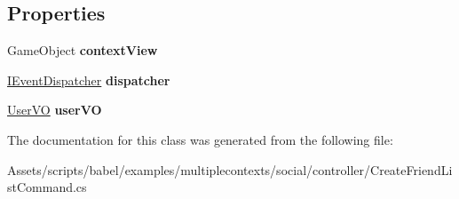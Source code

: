 \subsection*{Properties}
\begin{DoxyCompactItemize}
\item 
\hypertarget{classbabel_1_1examples_1_1multiplecontexts_1_1social_1_1_create_friend_list_command_af99f28abd09e148486f76323daf00289}{Game\-Object {\bfseries context\-View}}\label{classbabel_1_1examples_1_1multiplecontexts_1_1social_1_1_create_friend_list_command_af99f28abd09e148486f76323daf00289}

\item 
\hypertarget{classbabel_1_1examples_1_1multiplecontexts_1_1social_1_1_create_friend_list_command_a16263a55668eaff6994aca11c33bc69d}{\hyperlink{interfacebabel_1_1extensions_1_1dispatcher_1_1eventdispatcher_1_1api_1_1_i_event_dispatcher}{I\-Event\-Dispatcher} {\bfseries dispatcher}}\label{classbabel_1_1examples_1_1multiplecontexts_1_1social_1_1_create_friend_list_command_a16263a55668eaff6994aca11c33bc69d}

\item 
\hypertarget{classbabel_1_1examples_1_1multiplecontexts_1_1social_1_1_create_friend_list_command_ab720a2c2718c12059a6ca8c6a3a4dfcb}{\hyperlink{classbabel_1_1examples_1_1multiplecontexts_1_1social_1_1_user_v_o}{User\-V\-O} {\bfseries user\-V\-O}}\label{classbabel_1_1examples_1_1multiplecontexts_1_1social_1_1_create_friend_list_command_ab720a2c2718c12059a6ca8c6a3a4dfcb}

\end{DoxyCompactItemize}


The documentation for this class was generated from the following file\-:\begin{DoxyCompactItemize}
\item 
Assets/scripts/babel/examples/multiplecontexts/social/controller/Create\-Friend\-List\-Command.\-cs\end{DoxyCompactItemize}
